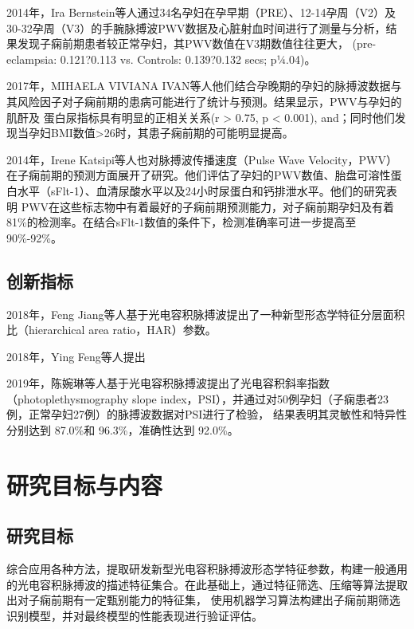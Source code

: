 2014年，Ira Bernstein等\cite{Ira2014}人通过34名孕妇在孕早期（PRE）、12-14孕周（V2）及30-32孕周（V3）的手腕脉搏波PWV数据及心脏射血时间进行了测量与分析，结果发现子痫前期患者较正常孕妇，其PWV数值在V3期数值往往更大，
(pre- eclampsia: 0.121?0.113 vs. Controls: 0.139?0.132 secs; p¼.04)。

2017年，MIHAELA VIVIANA IVAN等人\cite{VivianaIvan2018}他们结合孕晚期的孕妇的脉搏波数据与其风险因子对子痫前期的患病可能进行了统计与预测。结果显示，PWV与孕妇的肌酐及
蛋白尿指标具有明显的正相关关系(r > 0.75, p < 0.001), and；同时他们发现当孕妇BMI数值>26时，其患子痫前期的可能明显提高。

2014年，Irene Katsipi等人\cite{Katsipi2014}也对脉搏波传播速度（Pulse Wave Velocity，PWV）在子痫前期的预测方面展开了研究。他们评估了孕妇的PWV数值、胎盘可溶性蛋白水平（sFlt-1）、血清尿酸水平以及24小时尿蛋白和钙排泄水平。他们的研究表明
PWV在这些标志物中有着最好的子痫前期预测能力，对子痫前期孕妇及有着81\%的检测率。在结合sFlt-1数值的条件下，检测准确率可进一步提高至90\%-92\%。



\subsection{创新指标}

2018年，Feng Jiang等人基于光电容积脉搏波提出了一种新型形态学特征分层面积比（hierarchical area ratio，HAR）参数。

2018年，Ying Feng等人提出

2019年，陈婉琳等人\cite{Chen2019}基于光电容积脉搏波提出了光电容积斜率指数（photoplethysmography slope index，PSI），并通过对50例孕妇（子痫患者23例，正常孕妇27例）的脉搏波数据对PSI进行了检验，
结果表明其灵敏性和特异性分别达到 87.0\%和 96.3\%，准确性达到 92.0\%。

\section{研究目标与内容}

\subsection{研究目标}
综合应用各种方法，提取研发新型光电容积脉搏波形态学特征参数，构建一般通用的光电容积脉搏波的描述特征集合。在此基础上，通过特征筛选、压缩等算法提取出对子痫前期有一定甄别能力的特征集，
使用机器学习算法构建出子痫前期筛选识别模型，并对最终模型的性能表现进行验证评估。
